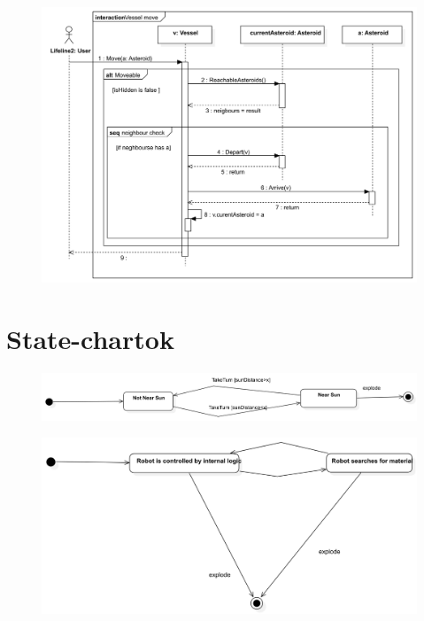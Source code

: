 \documentclass[../../projlab]{subfiles}
\begin{document}
\begin{figure}[H]
	\includegraphics[width=1\textwidth]{docs/2_Project/svg/Design Model!Vessel Actions!Vessel move!Vessel move_8.png}
	\centering
\end{figure}


\section{State-chartok}

\begin{figure}[H]
	\includegraphics[width=1\textwidth]{docs/2_Project/svg/Design Model!NearSun!NearSun_3.png}
	\centering
\end{figure}


\begin{figure}[H]
	\includegraphics[width=1\textwidth]{docs/2_Project/svg/Design Model!RobotActivities!RobotActivities_4.png}
	\centering
\end{figure}
\end{document}
